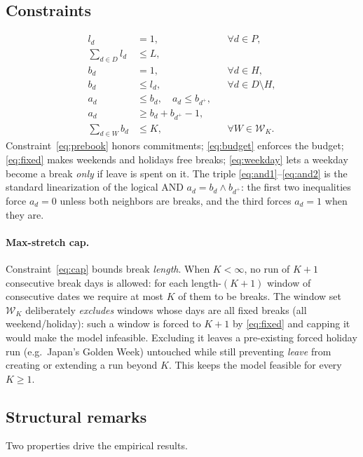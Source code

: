 \documentclass[10pt,twocolumn]{article}
\begin{document}
\subsection{Constraints}
\begin{align}
  l_d &= 1, & &\forall d \in P, \label{eq:prebook}\\
  \sum_{d \in D} l_d &\le L, & & \label{eq:budget}\\
  b_d &= 1, & &\forall d \in H, \label{eq:fixed}\\
  b_d &\le l_d, & &\forall d \in D \setminus H, \label{eq:weekday}\\
  a_d &\le b_d, \quad a_d \le b_{d^{+}}, & & \label{eq:and1}\\
  a_d &\ge b_d + b_{d^{+}} - 1, & & \label{eq:and2}\\
  \sum_{d \in W} b_d &\le K, & &\forall W \in \mathcal{W}_K. \label{eq:cap}
\end{align}
Constraint~\eqref{eq:prebook} honors commitments; \eqref{eq:budget} enforces the
budget; \eqref{eq:fixed} makes weekends and holidays free breaks;
\eqref{eq:weekday} lets a weekday become a break \emph{only} if leave is spent
on it. The triple \eqref{eq:and1}--\eqref{eq:and2} is the standard
linearization of the logical AND $a_d = b_d \wedge b_{d^{+}}$: the first two
inequalities force $a_d = 0$ unless both neighbors are breaks, and the third
forces $a_d = 1$ when they are.

\paragraph{Max-stretch cap.}
Constraint~\eqref{eq:cap} bounds break \emph{length}. When $K<\infty$, no run of
$K{+}1$ consecutive break days is allowed: for each length-$(K{+}1)$ window of
consecutive dates we require at most $K$ of them to be breaks. The window set
$\mathcal{W}_K$ deliberately \emph{excludes} windows whose days are all fixed
breaks (all weekend/holiday): such a window is forced to $K{+}1$ by
\eqref{eq:fixed} and capping it would make the model infeasible. Excluding it
leaves a pre-existing forced holiday run (e.g.\ Japan's Golden Week) untouched
while still preventing \emph{leave} from creating or extending a run beyond $K$.
This keeps the model feasible for every $K\ge 1$.

\subsection{Structural remarks}
\label{sec:structure}
Two properties drive the empirical results.
\end{document}
